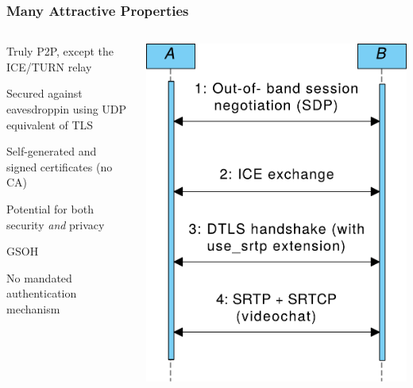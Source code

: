 \documentclass[handout, notes=show]{beamer}
\begin{document}

\begin{frame}
\frametitle{Many Attractive Properties}

\begin{columns}[T]
\begin{column}[T]{0.6\textwidth}
\setlength{\parskip}{0.5em}

Truly P2P, except the ICE/TURN relay

Secured against eavesdroppin using UDP equivalent of TLS

Self-generated and signed certificates (no CA)

Potential for both security {\it and\/} privacy

GSOH

No mandated authentication mechanism

\end{column}
\begin{column}[T]{0.4\textwidth}
\vspace{2.5em}
\includegraphics[width=1.0\textwidth]{webrtc-simplified-thinner}
\end{column}
\end{columns}
\end{frame}
\end{document}
